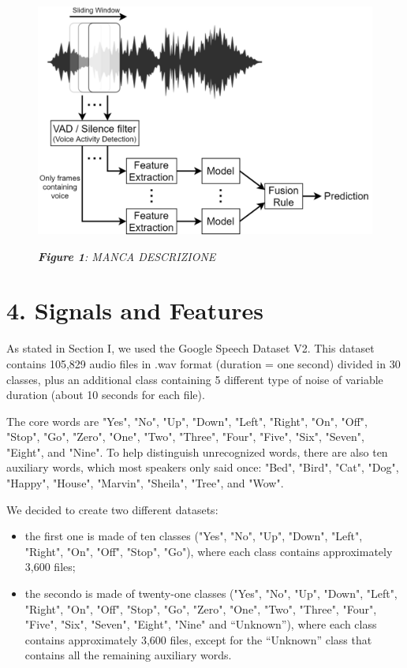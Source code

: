 \documentclass[conference]{IEEEtran}
\begin{document}
\begin{figure}
\centering
\includegraphics[scale=0.27]{End-To-End}

\begin{small}\textit{\textbf{Figure 1}: MANCA DESCRIZIONE}
\end{small}
\end{figure}

\section{4.	Signals and Features}
As stated in Section I, we used the Google Speech Dataset V2. This dataset contains 105,829 audio files in .wav format (duration =  one second) divided in 30 classes, plus an additional class containing 5 different type of noise of variable duration (about 10 seconds for each file).

The core words are "Yes", "No", "Up", "Down", "Left", "Right", "On", "Off", "Stop", "Go", "Zero", "One", "Two", "Three", "Four", "Five", "Six", "Seven", "Eight", and "Nine". To help distinguish unrecognized words, there are also ten auxiliary words, which most speakers only said once: "Bed", "Bird", "Cat", "Dog", "Happy", "House", "Marvin", "Sheila", "Tree", and "Wow".

We decided to create two different datasets:
\begin{itemize}
\item the first one is made of ten classes ("Yes", "No", "Up", "Down", "Left", "Right", "On", "Off", "Stop", "Go"), where each class contains approximately 3,600 files;
\item the secondo is made of twenty-one classes ("Yes", "No", "Up", "Down", "Left", "Right", "On", "Off", "Stop", "Go", "Zero", "One", "Two", "Three", "Four", "Five", "Six", "Seven", "Eight", "Nine" and “Unknown”), where each class contains approximately 3,600 files, except for the “Unknown” class that contains all the remaining auxiliary words.
\end{itemize}
\end{document}
